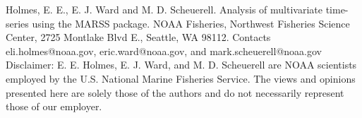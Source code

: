 

\thispagestyle{empty}
\vspace*{14cm}
\vfil
\begin{flushleft}

Holmes, E. E., E. J. Ward and M. D. Scheuerell. Analysis of multivariate time-series using the MARSS package. NOAA Fisheries, Northwest Fisheries Science Center, 2725 Montlake Blvd E., Seattle, WA 98112.  Contacts eli.holmes@noaa.gov, eric.ward@noaa.gov, and mark.scheuerell@noaa.gov
\newline
\newline
Disclaimer: E. E. Holmes, E. J. Ward, and M. D. Scheuerell are NOAA scientists employed by the U.S. National Marine Fisheries Service.  The views and opinions presented here are solely those of the authors and do not necessarily represent those of our employer.

\end{flushleft}

